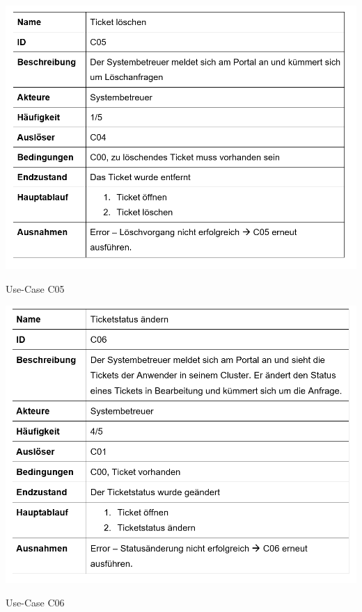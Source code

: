 \vspace{-.5cm}	
\begin{table}[h]
	\centering
	\includegraphics[scale=0.62]{figures/C05.png}
	\caption{Use-Case C05}
	\label{Abb_C05}
\end{table}
\newpage
\vspace{-.5cm}	
\begin{table}[h]
	\centering
	\includegraphics[scale=0.62]{figures/C06.png}
	\caption{Use-Case C06}
	\label{Abb_C06}
\end{table}
\newpage
\vspace{-.5cm}	
